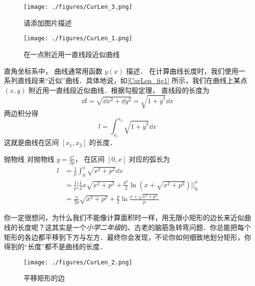 

\begin{figure}[ht]
\centering
\texttt{[image: ./figures/CurLen\_3.png]}
\caption{请添加图片描述} \label{CurLen_fig3}
\end{figure}

\begin{figure}[ht]
\centering
\texttt{[image: ./figures/CurLen\_1.png]}
\caption{在一点附近用一直线段近似曲线} \label{CurLen_fig1}
\end{figure}

直角坐标系中， 曲线通常用函数 $y(x)$ 描述． 在计算曲线长度时，我们使用一系列直线段来“近似”曲线．具体地说，如\autoref{CurLen_fig1} 所示，我们在曲线上某点 $(x, y)$ 附近用一直线段近似曲线．根据勾股定理， 直线段的长度为
\begin{equation}
\dd{l} = \sqrt{\dd{x}^2 + \dd{y}^2} = \sqrt{1 + \dot y^2} \dd{x}
\end{equation}
两边积分得
\begin{equation}\label{CurLen_eq1}
l = \int_{x_1}^{x_2} \sqrt{1 + \dot y^2} \dd{x}
\end{equation}
这就是曲线在区间 $[x_1, x_2]$ 的长度．

\begin{example}{抛物线}
对抛物线 $y=\frac{x^2}{2p}$， 在区间 $[0,x]$ 对应的弧长为
\begin{equation}
\begin{aligned}
l& = \frac{1}{p}\int_{0}^{x}\sqrt{x^2+p^2}\dd{x}\\
&=\frac{1}{p}\bigg[\frac{1}{2}x\sqrt{x^2+p^2}+\frac{p^2}{2}\ln(x+\sqrt{x^2+p^2})\bigg]\Bigg\lvert_{0}^{x}\\
&=\frac{x}{2p}\sqrt{x^2+p^2}+\frac{p}{2}\ln\frac{x+\sqrt{x^2+p^2}}{p}
\end{aligned}
\end{equation}
\end{example}

你一定很想问，为什么我们不能像计算面积时一样，用无限小矩形的边长来近似曲线的长度呢？这其实是一个\textsl{小学二年级}的、古老的脑筋急转弯问题．你总能把每个矩形的各边都平移到下方与左方．最终你会发现，不论你如何细致地划分矩形，你得到的“长度”都不是曲线的长度．
\begin{figure}[ht]
\centering
\texttt{[image: ./figures/CurLen\_2.png]}
\caption{平移矩形的边} \label{CurLen_fig2}
\end{figure}

